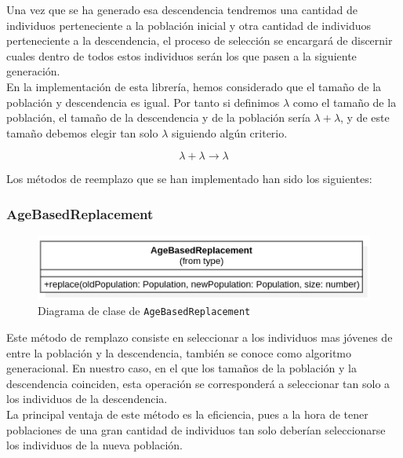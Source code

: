 Una vez que se ha generado esa descendencia tendremos una cantidad de individuos perteneciente a la población inicial y otra cantidad de individuos perteneciente a la descendencia, el proceso de selección se encargará de discernir cuales dentro de todos estos individuos serán los que pasen a la siguiente generación. \\

En la implementación de esta librería, hemos considerado que el tamaño de la población y descendencia es igual. Por tanto si definimos $\lambda$ como el tamaño de la población, el tamaño de la descendencia y de la población sería $\lambda + \lambda$, y de este tamaño debemos elegir tan solo $\lambda$ siguiendo algún criterio.

\begin{equation}
    \lambda + \lambda \rightarrow \lambda
\end{equation}

Los métodos de reemplazo que se han implementado han sido los siguientes:

\subsubsection{AgeBasedReplacement}

\begin{figure}[ht]
    \centering
    \includegraphics[scale=0.6]{mem/images/cap-4/4.2.8(Reemplazo)/AgeBasedReplacement.png}
    \caption{Diagrama de clase de \texttt{AgeBasedReplacement}}
    \label{fig:my_label}
\end{figure}

Este método de remplazo consiste en seleccionar a los individuos mas jóvenes de entre la población y la descendencia, también se conoce como algoritmo generacional. En nuestro caso, en el que los tamaños de la población y la descendencia coinciden, esta operación se corresponderá a seleccionar tan solo a los individuos de la descendencia. \\

La principal ventaja de este método es la eficiencia, pues a la hora de tener poblaciones de una gran cantidad de individuos tan solo deberían seleccionarse los individuos de la nueva población. \\

